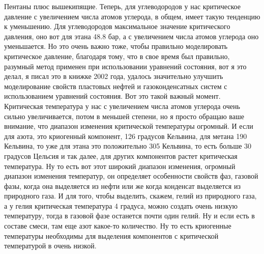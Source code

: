 \documentclass[main.tex]{subfiles}
\begin{document}
Пентаны плюс вышекипящие.
Теперь, для углеводородов у нас критическое давление с увеличением числа атомов углерода, в общем, имеет такую тенденцию к уменьшению.
Для углеводородов максимальное значение критического давления, оно вот для этана 48.8 бар, а с увеличением числа атомов углерода оно уменьшается.
Но это очень важно тоже, чтобы правильно моделировать критическое давление, благодаря тому, что в свое время был правильно, разумный метод применен при использовании уравнений состояния, вот я это делал, я писал это в книжке 2002 года, удалось значительно улучшить моделирование свойств пластовых нефтей и газоконденсатных систем с использованием уравнений состояния.
Вот это такой важный момент.
Критическая температура у нас с увеличением числа атомов углерода очень сильно увеличивается, потом в меньшей степени, но я просто обращаю ваше внимание, что диапазон изменения критической температуры огромный.
И если для азота, это криогенный компонент, 126 градусов Кельвина, для метана 190 Кельвина, то уже для этана это положительно 305 Кельвина, то есть больше 30 градусов Цельсия и так далее, для других компонентов растет критическая температура.
Ну то есть вот этот широкий диапазон изменения, огромный диапазон изменения температур, он определяет особенности свойств фаз, газовой фазы, когда она выделяется из нефти или же когда конденсат выделяется из природного газа.
И для того, чтобы выделить, скажем, гелий из природного газа, а у гелия критическая температура 4 градуса, можно создать очень низкую температуру, тогда в газовой фазе останется почти один гелий.
Ну и если есть в составе смеси, там еще азот какое-то количество.
Ну то есть криогенные температуры необходимы для выделения компонентов с критической температурой в очень низкой.
\end{document}
